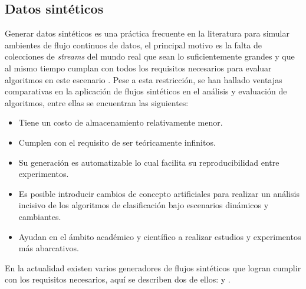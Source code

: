 \subsection{Datos sintéticos}
\label{stream_syn}

Generar datos sintéticos es una práctica frecuente en la literatura para simular
ambientes de flujo continuos de datos, el principal motivo es la falta de
colecciones de \textit{streams} del mundo real que sean lo suficientemente
grandes y que al mismo tiempo cumplan con todos los requisitos necesarios para
evaluar algoritmos en este escenario \cite{kirkby_improving_2007}. Pese a esta
restricción, se han hallado ventajas comparativas en la aplicación de flujos
sintéticos en el análisis y evaluación de algoritmos, entre ellas se encuentran
las siguientes:

\begin{itemize}

	\item Tiene un costo de almacenamiento relativamente menor.

	\item Cumplen con el requisito de ser teóricamente infinitos.

	\item Su generación es automatizable lo cual facilita su reproducibilidad
	      entre experimentos.

	\item Es posible introducir cambios de concepto artificiales para realizar un
	      análisis incisivo de los algoritmos de clasificación bajo escenarios
	      dinámicos y cambiantes.

	\item Ayudan en el ámbito académico y científico a realizar estudios y
	      experimentos más abarcativos.

\end{itemize}

En la actualidad existen varios generadores de flujos sintéticos que logran
cumplir con los requisitos necesarios, aquí se describen dos de ellos:
 y .


